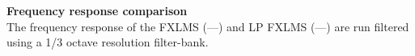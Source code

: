 \begin{minipage}{.43\columnwidth}
\textbf{Frequency response comparison}\\
The frequency response of the FXLMS (\textcolor{MATLABblue}{---}) and LP FXLMS (\textcolor{MATLABred}{---}) are run filtered using a 1/3 octave resolution filter-bank.


\end{minipage}%
\hspace{4mm}
\begin{minipage}{0.5\columnwidth}
	
\end{minipage}
